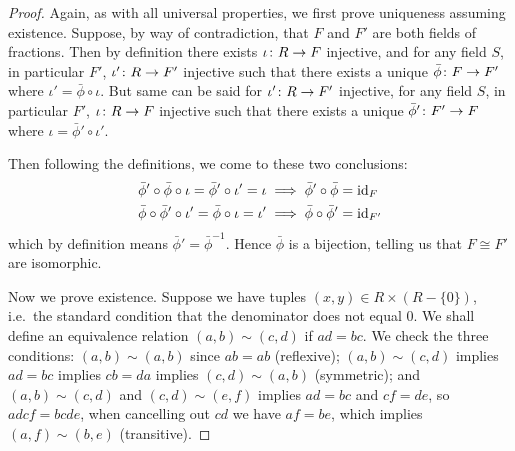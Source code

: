 \begin{proof}
    Again, as with all universal properties,
    we first prove uniqueness assuming existence.
    Suppose, by way of contradiction,
    that \(F\) and \(F'\) are both fields of fractions.
    Then by definition there exists \(\iota\colon R\to F\) injective,
    and for any field \(S\), in particular \(F'\),
    \(\iota'\colon R\to F'\) injective
    such that there exists a unique \(\bar{\phi}\colon F\to F'\)
    where \(\iota' = \bar{\phi}\circ\iota\).
    But same can be said for \(\iota'\colon R\to F'\) injective,
    for any field \(S\), in particular \(F'\),
    \(\iota\colon R\to F\) injective
    such that there exists a unique \(\bar{\phi}'\colon F'\to F\)
    where \(\iota = \bar{\phi}'\circ\iota'\).
    \begin{center}
    \end{center}

    Then following the definitions,
    we come to these two conclusions:
    \begin{align*}
        \bar{\phi}'\circ\bar{\phi}\circ\iota = \bar{\phi}'\circ\iota' = \iota
        &\implies \bar{\phi}'\circ\bar{\phi} = \operatorname{id}_F \\
        \bar{\phi}\circ\bar{\phi}'\circ\iota' = \bar{\phi}\circ\iota = \iota'
        &\implies \bar{\phi}\circ\bar{\phi}' = \operatorname{id}_{F'}
    \end{align*}
    which by definition means \(\bar{\phi}' = \bar{\phi}^{-1}\).
    Hence \(\bar{\phi}\) is a bijection,
    telling us that \(F \cong F'\) are isomorphic.

    Now we prove existence.
    Suppose we have tuples \((x,y) \in R \times (R - \{0\})\),
    i.e.\ the standard condition that the denominator does not equal 0.
    We shall define an equivalence relation
    \((a,b) \sim (c,d)\) if \(ad = bc\).
    We check the three conditions:
    \((a,b) \sim (a,b)\) since \(ab = ab\) (reflexive);
    \((a,b) \sim (c,d)\) implies \(ad = bc\)
    implies \(cb = da\) implies \((c,d) \sim (a,b)\) (symmetric);
    and \((a,b) \sim (c,d)\) and \((c,d) \sim (e,f)\)
    implies \(ad = bc\) and \(cf = de\),
    so \(adcf = bcde\), when cancelling out \(cd\) we have \(af = be\),
    which implies \((a,f) \sim (b,e)\) (transitive).


\end{proof}
